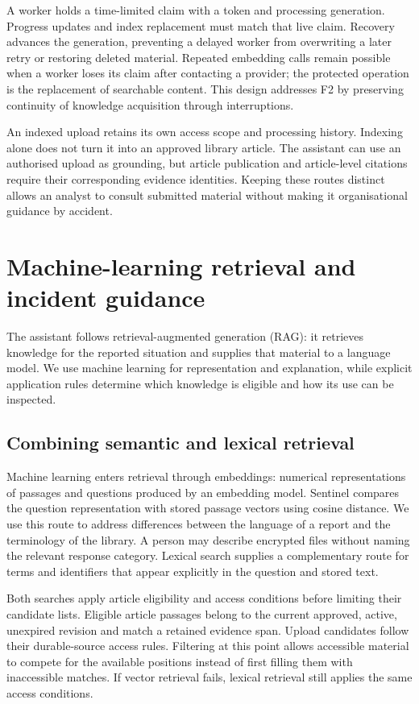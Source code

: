 A worker holds a time-limited claim with a token and processing generation. Progress updates and index replacement must match that live claim. Recovery advances the generation, preventing a delayed worker from overwriting a later retry or restoring deleted material. Repeated embedding calls remain possible when a worker loses its claim after contacting a provider; the protected operation is the replacement of searchable content. This design addresses F2 by preserving continuity of knowledge acquisition through interruptions.

An indexed upload retains its own access scope and processing history. Indexing alone does not turn it into an approved library article. The assistant can use an authorised upload as grounding, but article publication and article-level citations require their corresponding evidence identities. Keeping these routes distinct allows an analyst to consult submitted material without making it organisational guidance by accident.

\section{Machine-learning retrieval and incident guidance}

The assistant follows retrieval-augmented generation (RAG): it retrieves knowledge for the reported situation and supplies that material to a language model. We use machine learning for representation and explanation, while explicit application rules determine which knowledge is eligible and how its use can be inspected.

\subsection{Combining semantic and lexical retrieval}

Machine learning enters retrieval through embeddings: numerical representations of passages and questions produced by an embedding model. Sentinel compares the question representation with stored passage vectors using cosine distance. We use this route to address differences between the language of a report and the terminology of the library. A person may describe encrypted files without naming the relevant response category. Lexical search supplies a complementary route for terms and identifiers that appear explicitly in the question and stored text.

Both searches apply article eligibility and access conditions before limiting their candidate lists. Eligible article passages belong to the current approved, active, unexpired revision and match a retained evidence span. Upload candidates follow their durable-source access rules. Filtering at this point allows accessible material to compete for the available positions instead of first filling them with inaccessible matches. If vector retrieval fails, lexical retrieval still applies the same access conditions.

